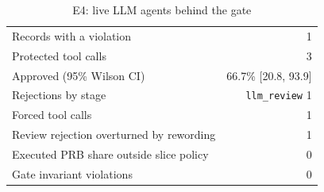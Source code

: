 \begin{table}[!t]
\centering
\caption{E4: live LLM agents behind the gate}\label{tab:live}
\begin{tabular}{lr}
\hline
Records with a violation & 1 \\
Protected tool calls & 3 \\
Approved (95\% Wilson CI) & 66.7\% [20.8, 93.9] \\
Rejections by stage & \texttt{llm\_review} 1 \\
Forced tool calls & 1 \\
Review rejection overturned by rewording & 1 \\
Executed PRB share outside slice policy & 0 \\
Gate invariant violations & 0 \\
\hline
\end{tabular}
\end{table}
